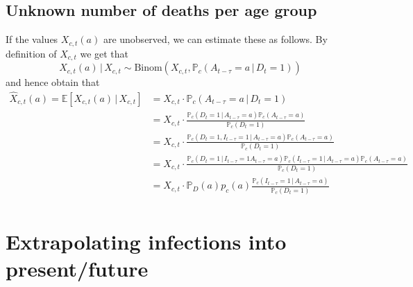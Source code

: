 \documentclass[a4paper]{article}
\renewcommand\P{\mathbb{P}}
\newcommand\E{\mathbb{E}}
\newcommand{\given}{\, \vert \,}
\begin{document}
\subsection{Unknown number of deaths per age group}
%
If the values $X_{c,t}(a)$ are unobserved, we can estimate these as follows. By definition of $X_{c,t}$ we get that
$$X_{c,t}(a) \given X_{c,t} \sim \text{Binom}(X_{c,t}, \P_c(A_{t-\tau} = a \given D_{t} = 1))$$
and hence obtain that
\begin{align*}
\hat{X}_{c,t}(a) = \E[X_{c,t}(a) \given X_{c,t}] 	&= X_{c,t} \cdot \P_c(A_{t-\tau} = a \given D_{t} = 1) \\
																		&= X_{c,t} \cdot \frac{\P_c(D_t = 1 \given A_{t-\tau} = a) \P_c(A_{t-\tau} = a)}{\P_c(D_t = 1)} \\
																		&= X_{c,t} \cdot \frac{\P_c(D_t = 1, I_{t-\tau} = 1 \given A_{t-\tau} = a) \P_c(A_{t-\tau} = a)}{\P_c(D_t = 1)} \\
																		&= X_{c,t} \cdot \frac{\P_c(D_t = 1\given I_{t-\tau} = 1 A_{t-\tau} = a) \P_c(I_{t-\tau} = 1 \given A_{t-\tau} = a) \P_c(A_{t-\tau} = a)}{\P_c(D_t = 1)} \\
																		&= X_{c,t} \cdot \P_D(a) p_c(a) \frac{\P_c(I_{t-\tau} = 1 \given A_{t-\tau} = a) }{\P_c(D_t = 1)} \\
\end{align*}

\section{Extrapolating infections into present/future}
\end{document}
